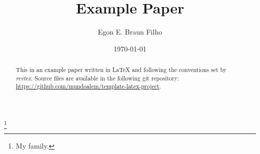 \documentclass[aps,prl,twocolumn,groupedaddress]{revtex4-2}
\begin{document}
\title{Example Paper}

\author{Egon E. Braun Filho}
\thanks{My family.}

\date{\today}

\begin{abstract}
	This in an example paper written in \LaTeX{} and following the conventions set by \emph{revtex}. Source files are
	available in the following git repository: \url{https://github.com/mundoalem/template-latex-project}.
\end{abstract}

\maketitle






\end{document}
